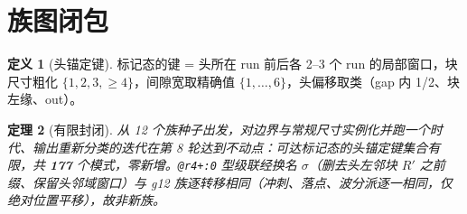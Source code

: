 \documentclass[11pt]{ctexart}
\newtheorem{theorem}{定理}[section]
\theoremstyle{definition}
\newtheorem{definition}[theorem]{定义}
\begin{document}
\section{族图闭包}

\begin{definition}[头锚定键]\label{def:key}
标记态的键 = 头所在 run 前后各 2--3 个 run 的局部窗口，块尺寸粗化 $\{1,2,3,\ge4\}$，间隙宽取精确值 $\{1,\dots,6\}$，头偏移取类（gap 内 1/2、块左缘、out）。
\end{definition}

\begin{theorem}[有限封闭]\label{thm:closure}
从 12 个族种子出发，对边界与常规尺寸实例化并跑一个时代、输出重新分类的迭代在第 8 轮达到不动点：可达标记态的头锚定键集合有限，共 \textbf{177} 个模式，零新增。\texttt{@r4+:0} 型级联经换名 $\sigma$（删去头左邻块 $R'$ 之前缀、保留头邻域窗口）与 g12 族逐转移相同（冲刺、落点、波分派逐一相同，仅绝对位置平移），故非新族。
\end{theorem}
\end{document}
